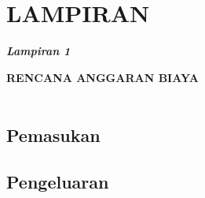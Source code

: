 \appendix
\chapter*{LAMPIRAN}
\setcounter{section}{0} %
\renewcommand{\thesection}{\Alph{section}}
\renewcommand{\thesubsection}{\arabic{subsection}}
\setcounter{page}{1}

\textbf{\textit{Lampiran 1}}\\

\begin{center}
        \textbf{\MakeUppercase{\large{rencana anggaran biaya}}}\\
        \textbf{\MakeUppercase{\normalsize{\judulproyek}}}\\
\end{center}

\section{Pemasukan}


\section{Pengeluaran}
\subsection{}